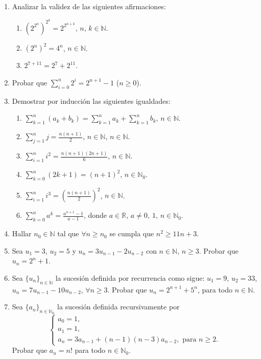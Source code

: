 \documentclass[a4paper,12pt,twoside,spanish,reqno]{amsbook}
\numberwithin{equation}{section}
\begin{document}
\begin{enumerate}
\item Analizar la validez de las siguientes afirmaciones:
    \begin{enumerate}
        \item  $(2^{2^n})^{2^k} = 2^{2^{n+k}}$,  $n$, $k \in {\mathbb N}$.
        \item $(2^n)^2 = 4^n$, $n \in {\mathbb N}$.
        \item $2^{7+11} = 2^7 + 2^{11}$.
    \end{enumerate}

\item Probar que $\sum_{i=0}^n 2^i = 2^{n+1} -1$ ($n \ge 0$). 

\item Demostrar por inducción  las siguientes igualdades:
    \begin{enumerate}
        \item  $\displaystyle{ \sum_{k=1}^n (a_k + b_k) = \sum_{k=1}^n a_k + \sum_{k=1}^n b_k}$, $n\in \mathbb N$.
        \item  $\displaystyle{ \sum_{j=1}^n j = \frac{n(n+1)}{2}}$, $n\in \mathbb N$, $n\in \mathbb N$.
        \item  $\displaystyle{ \sum_{i=1}^n i^2 = \frac{n(n+1)(2n+1)}{6}}$, $n\in \mathbb N$.
        \item  $\displaystyle{ \sum_{k=0}^n (2k+1) = (n+1)^2}$, $n\in \mathbb N_0$.
        \item  $\displaystyle{ \sum_{i=1}^n i^3 = \left( \frac{n(n+1)}{2 }\right)^2}$, $n\in \mathbb N$.
        \item  $\displaystyle{ \sum_{k=0}^n a^k = \frac{a^{n+1}-1}{a-1}}$, donde $a\in {\mathbb R}$, $a \neq 0,\ 1$, $n\in \mathbb N_0$.
    \end{enumerate}

\item Hallar $n_0 \in {\mathbb N}$ tal que $\forall n \ge n_0$ se cumpla que $n^2 \ge 11 n + 3$.

\item Sea $u_1=3$, $u_2=5$ y $u_n=3 u_{n-1} - 2 u_{n-2}$ con $n\in \mathbb N$, $n\geq 3$.
Probar que $u_n=2^n+1$.

\item Sea $\{ u_n \}_{n \in \mathbb N}$ la sucesión definida por recurrencia como sigue: $u_1 = 9$, $u_2 = 33$, $u_n = 7u_{n-1} - 10u_{n-2}$, $\forall n \geq 3$. Probar que $u_n = 2^{n+1} + 5^n$, para todo $n \in \mathbb N$.


\item  Sea $\{a_n\}_{n\in\mathbb N_0}$ la sucesión definida recursivamente por
    \begin{equation*}
        \begin{cases}
            a_0=1, \\a_1=1, \\a_{n} = 3a_{n-1}+(n-1)(n-3)a_{n-2}, \text{ para $n\geq 2$}.
        \end{cases}
    \end{equation*}
    Probar que $a_n=n!$ para todo $n\in \mathbb N_0$.


\end{enumerate}
\end{document}

